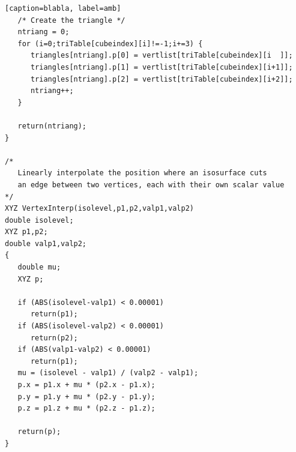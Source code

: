 \documentclass[12pt]{article}
\begin{document}
\begin{lstlisting}[frame=single, basicstyle=\scriptsize][caption=blabla, label=amb]
   /* Create the triangle */
   ntriang = 0;
   for (i=0;triTable[cubeindex][i]!=-1;i+=3) {
      triangles[ntriang].p[0] = vertlist[triTable[cubeindex][i  ]];
      triangles[ntriang].p[1] = vertlist[triTable[cubeindex][i+1]];
      triangles[ntriang].p[2] = vertlist[triTable[cubeindex][i+2]];
      ntriang++;
   }

   return(ntriang);
}

/*
   Linearly interpolate the position where an isosurface cuts
   an edge between two vertices, each with their own scalar value
*/
XYZ VertexInterp(isolevel,p1,p2,valp1,valp2)
double isolevel;
XYZ p1,p2;
double valp1,valp2;
{
   double mu;
   XYZ p;

   if (ABS(isolevel-valp1) < 0.00001)
      return(p1);
   if (ABS(isolevel-valp2) < 0.00001)
      return(p2);
   if (ABS(valp1-valp2) < 0.00001)
      return(p1);
   mu = (isolevel - valp1) / (valp2 - valp1);
   p.x = p1.x + mu * (p2.x - p1.x);
   p.y = p1.y + mu * (p2.y - p1.y);
   p.z = p1.z + mu * (p2.z - p1.z);

   return(p);
}
\end{lstlisting}
\end{document}

